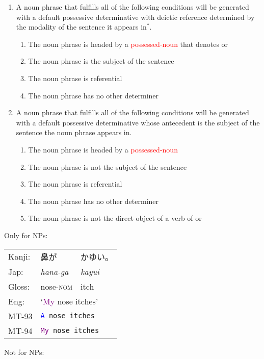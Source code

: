 \documentclass[a4paper,landscape,headrule,footrule,dvips]{foils}
\newcommand{\psp}[1]{\textcolor{purple}{#1}}
\newcommand{\dtr}[1]{\textcolor{blue}{#1}}
\newcommand{\trg}[1]{\textcolor{red}{#1}}
\begin{document}
\begin{CJK}{UTF8}{min}
  \myslide{Translating NPs headed by \trg{possessed-nouns}}
     \begin{enumerate} %
     \item A noun phrase that fulfills all of the following conditions
       will be generated with a default possessive determinative with
       deictic reference determined by the modality of the sentence it
       appears in$^*$.
        \begin{enumerate}
        \item The noun phrase is headed by a \trg{possessed-noun} that
          denotes  or 
        \item The noun phrase is the subject of the sentence
        \item The noun phrase is referential
        \item The noun phrase has no other determiner
        \end{enumerate}
\newpage
\MyLogo{}
      \item A noun phrase that fulfills all of the following
        conditions will be generated with a default possessive
        determinative whose antecedent is the subject of the sentence
        the noun phrase appears in.
        \begin{enumerate}
        \item The noun phrase is headed by a \trg{possessed-noun} 
        \item The noun phrase is not the subject of the sentence
        \item The noun phrase is referential
        \item The noun phrase has no other determiner
        \item The noun phrase is not the direct object of a verb of
           or 
        \end{enumerate}
      \end{enumerate}



\noindent Only for  NPs:

\begin{exe}
  \ex
\begin{tabular}[t]{lll}
Kanji: &  鼻が &  かゆい。\\
Jap:   &  \sl hana-ga & \sl kayui \\
Gloss: &   nose-\textsc{nom} &  itch \\
Eng:   & \multicolumn{2}{l}{`\psp{My} nose itches'} \\
MT-93 & \multicolumn{2}{l}{\tt \dtr{A} nose itches} \\
MT-94 & \multicolumn{2}{l}{\tt \psp{My} nose itches} 
\end{tabular}
\end{exe}
\newpage
\noindent Not for  NPs:


\end{CJK}
\end{document}
